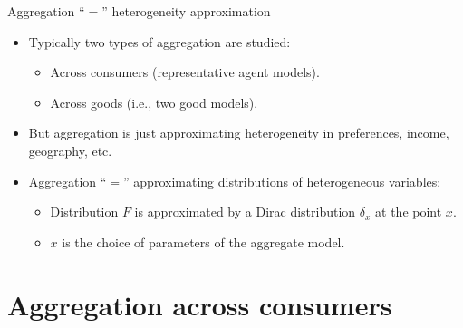 \documentclass[10pt, handout]{beamer}
\begin{document}
\begin{frame}{Aggregation ``$=$'' heterogeneity approximation}
	\vfill
	\begin{itemize} 
		\item Typically two types of aggregation are studied:\vspace{.5ex}
			\begin{itemize}
				\item Across consumers (representative agent models). \vspace{1ex}
				\item Across goods (i.e., two good models). 
			\end{itemize} \vfill \pause

		\item But aggregation is just approximating heterogeneity in preferences, income, geography, etc. \vfill \pause
			
		\item Aggregation ``$=$'' approximating distributions of heterogeneous variables:\vspace{.5ex}
			\begin{itemize}
				\item Distribution $F$ is approximated by a Dirac distribution $\delta_{x}$ at the point $x$. \vspace{1ex}
				\item $x$ is the choice of parameters of the aggregate model. 
			\end{itemize} \vfill

	\end{itemize}

\end{frame}

\section{Aggregation across consumers}

\begin{frame}
	\tableofcontents[currentsection]
\end{frame}
\end{document}
